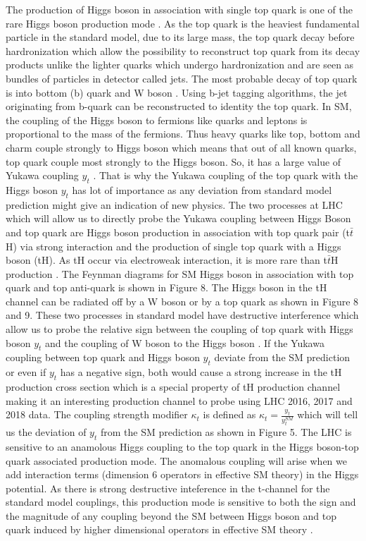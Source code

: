 \documentclass[final,3p]{CSP}
\begin{document}
The production of Higgs boson in association with single top quark is one of the rare Higgs 
boson production mode \cite{Khachatryan_2016}. As the top 
quark is the heaviest fundamental particle in the standard model, due to its large mass, the 
top quark decay before 
hardronization which allow the possibility to reconstruct top quark from its decay products 
unlike the lighter quarks which 
undergo hardronization and are seen as bundles of particles in detector called jets. The most 
probable decay of top quark is 
into bottom (b) quark and W boson \cite{nishiwaki2014tth}. Using b-jet tagging algorithms, the jet originating from 
b-quark can be reconstructed to 
identity the top quark. In SM, the coupling of the Higgs boson to fermions like quarks and 
leptons is proportional to the mass 
of the fermions. Thus heavy quarks like top, bottom and charm couple strongly to Higgs boson 
which means that out of all known 
quarks, top quark couple most strongly to the Higgs boson. So, it has a large value of Yukawa 
coupling $y_t$ \cite{Aad_2016}. That is why the 
Yukawa coupling of the top quark with the Higgs boson $y_t$ has lot of importance as any 
deviation from standard model prediction might give an indication of new physics. The two 
processes at LHC which will allow us to directly probe the Yukawa 
coupling between Higgs Boson and top quark are Higgs boson production in association with top 
quark pair (t$\bar{t}$H) via 
strong interaction and the production of single top quark with a Higgs boson (tH). As tH 
occur via electroweak interaction, it 
is more rare than t$\bar{t}$H production \cite{sirunyan2018search}. The Feynman diagrams for SM Higgs boson in association with top quark and top anti-quark is shown in Figure 8. The Higgs boson in the tH channel can be radiated 
off by a W boson or by a top 
quark as shown in Figure 8 and 9. These two processes in standard model have destructive interference which allow us to 
probe the relative sign between 
the coupling of top quark with Higgs boson $y_t$ and the coupling of W boson to the Higgs 
boson \cite{choudhury2019search}. If the Yukawa coupling between top quark and Higgs boson $y_t$ deviate from the SM 
prediction or even if $y_t$ has a negative sign, both would cause a strong increase in the tH 
production cross section which is a special property of tH production channel making it an 
interesting production channel to probe using LHC 2016, 2017 and 2018 data. The coupling 
strength modifier $\kappa_t$ is defined as $\kappa_t = \frac{y_t}{y^{SM}_t}$ which will tell 
us the deviation of $y_t$ from the SM prediction as shown in Figure 5. 
The LHC is sensitive to an anamolous Higgs coupling to the top quark in the Higgs boson-top 
quark associated production mode. 
The anomalous coupling will arise when we add interaction terms (dimension 6 operators in 
effective SM theory) in the Higgs 
potential. As there is strong destructive inteference in the t-channel for the standard model 
couplings, this production mode 
is sensitive to both the sign and the magnitude of any coupling beyond the SM between Higgs 
boson and top quark induced by 
higher dimensional operators in effective SM theory \cite{sirunyan2019search}.
\end{document}
